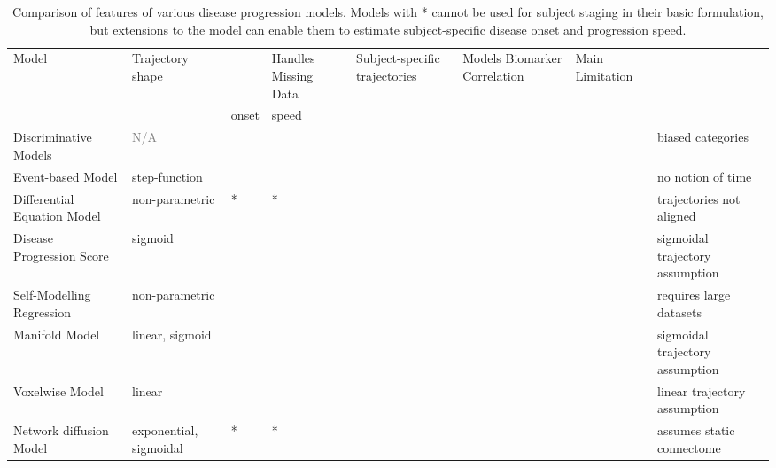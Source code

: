 \begin{landscape}



\newcommand{\xmark}{\ding{55}}%

\newcommand{\myyes}{\textcolor{green1}{\Large{\checkmark}}}
\newcommand{\myno}{\textcolor{red1}{\Large{\xmark}}}

\begin{table}
\centering
\footnotesize
\renewcommand{\arraystretch}{1.5}%
\begin{tabular}{>{\centering\arraybackslash}p{3.5 cm} | >{\centering\arraybackslash}p{2.5 cm} | >{\centering\arraybackslash}p{1.5 cm} | >{\centering\arraybackslash}p{1.5 cm} | >{\centering\arraybackslash}p{2.5 cm} | >{\centering\arraybackslash}p{2.5 cm} | >{\centering\arraybackslash}p{3 cm} | >{\centering\arraybackslash}p{3.5 cm}}
 Model & Trajectory shape & \multicolumn{2}{c|}{Subject Staging} & Handles Missing Data & Subject-specific trajectories & Models Biomarker Correlation & Main Limitation \\
 & & onset & speed & & & & \\
 \hline
 Discriminative Models & \textcolor{gray}{N/A} & \myno & \myno  & \myyes & \myno  & \myno & biased categories\\
  \hline
 Event-based Model & step-function & \myyes & \myno & \myno & \myno & \myno & no notion of time\\
  \hline
 Differential Equation Model & non-parametric & \myno * & \myno * & \myyes & \myno & \myno  & trajectories not aligned\\
  \hline
 Disease Progression Score & sigmoid & \myyes & \myyes & \myyes & \myno & \myno & sigmoidal trajectory assumption \\
  \hline
 Self-Modelling Regression & non-parametric & \myyes & \myyes & \myno & \myyes & \myno & requires large datasets \\
  \hline
 Manifold Model & linear, sigmoid & \myyes & \myyes & \myno & \myyes & \myno & sigmoidal trajectory assumption \\
  \hline
 Voxelwise Model & linear & \myyes & \myyes & \myyes & \myno & \myyes & linear trajectory assumption\\
  \hline
 Network diffusion Model & exponential, sigmoidal & \myno * & \myno *& \myno & \myno & \myyes & assumes static connectome\\

\end{tabular}
\caption{Comparison of features of various disease progression models. Models with * cannot be used for subject staging in their basic formulation, but extensions to the model can enable them to estimate subject-specific disease onset and progression speed.}
\label{tab:compDPMs}
\end{table}
\end{landscape}

